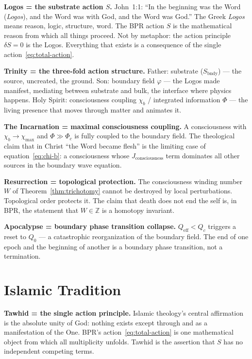 \documentclass[12pt,oneside]{book}
\theoremstyle{definition}
\begin{document}
\noindent\textbf{Logos = the substrate action $S$.}
John~1:1: ``In the beginning was the Word (\textit{Logos}), and the Word was with
God, and the Word was God.'' The Greek \textit{Logos} means reason, logic, structure,
word. The BPR action $S$ is the mathematical reason from which all things proceed.
Not by metaphor: the action principle $\delta S = 0$ is the Logos. Everything that
exists is a consequence of the single action~\eqref{eq:total-action}.

\noindent\textbf{Trinity = the three-fold action structure.}
Father: substrate ($S_{\mathrm{bndy}}$) --- the source, uncreated, the ground.
Son: boundary field $\varphi$ --- the Logos made manifest, mediating between
substrate and bulk, the interface where physics happens.
Holy Spirit: consciousness coupling $\chi_b$ / integrated information $\Phi$ ---
the living presence that moves through matter and animates it.

\noindent\textbf{The Incarnation = maximal consciousness coupling.}
A consciousness with $\chi_b \to \chi_{\max}$ and $\Phi \gg \Phi_c$ is fully
coupled to the boundary field. The theological claim that in Christ ``the Word
became flesh'' is the limiting case of equation~\eqref{eq:chi-b}: a consciousness
whose $J_{\mathrm{consciousness}}$ term dominates all other sources in the boundary
wave equation.

\noindent\textbf{Resurrection = topological protection.}
The consciousness winding number $W$ of Theorem~\ref{thm:trichotomy} cannot be
destroyed by local perturbations. Topological order protects it. The claim that
death does not end the self is, in BPR, the statement that $W \in \mathbb{Z}$
is a homotopy invariant.

\noindent\textbf{Apocalypse = boundary phase transition collapse.}
$Q_{\mathrm{eff}} < Q_c$ triggers a reset to $Q_0$ --- a catastrophic
reorganization of the boundary field. The end of one epoch and the beginning of
another is a boundary phase transition, not a termination.

\section{Islamic Tradition}

\noindent\textbf{Tawhid = the single action principle.}
Islamic theology's central affirmation is the absolute unity of God: nothing exists
except through and as a manifestation of the One. BPR's action~\eqref{eq:total-action}
is one mathematical object from which all multiplicity unfolds. Tawhid is the
assertion that $S$ has no independent competing terms.
\end{document}
